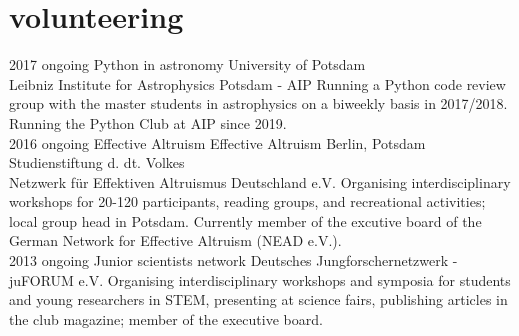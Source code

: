 \documentclass[]{k-cv} %
\begin{document}
\section{volunteering}
\begin{entrylist}
\entry
{2017 \to ongoing}
{Python in astronomy}
{University of Potsdam\vspace{-.1cm}\\\null\hfill Leibniz Institute for Astrophysics Potsdam - AIP}
{Running a Python code review group with the master students in astrophysics on a biweekly basis in 2017/2018. Running the Python Club at AIP since 2019.\\}
\entry
{2016 \to ongoing}
{Effective Altruism}
{Effective Altruism Berlin, Potsdam\vspace{-.1cm}
\\\null\hfill Studienstiftung d. dt. Volkes
\vspace{-.1cm}\\\null\hfill Netzwerk f\"ur Effektiven Altruismus Deutschland e.V.}
{Organising interdisciplinary workshops for 20-120 participants, reading groups, and recreational activities; local group head in Potsdam. Currently member of the excutive board of the German Network for Effective Altruism (NEAD e.V.).\\}
\entry
{2013 \to ongoing}
{Junior scientists network}
{Deutsches Jungforschernetzwerk - juFORUM e.V.}
{Organising interdisciplinary workshops and symposia for students and young researchers in STEM, presenting at science fairs, publishing articles in the club magazine; member of the executive board.}
\end{entrylist}
\end{document}
